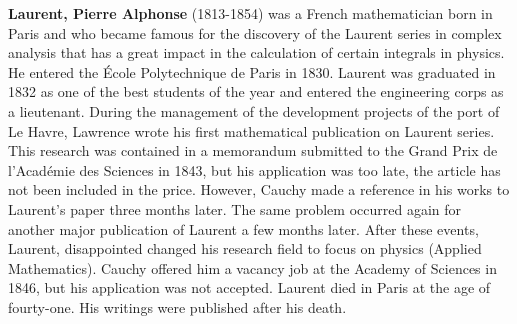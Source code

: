 \textbf{Laurent, Pierre Alphonse} (1813-1854) was a French mathematician born in Paris and who became famous for the discovery of the Laurent series in complex analysis that has a great impact in the calculation of certain integrals in physics. He entered the École Polytechnique de Paris in 1830. Laurent was graduated in 1832 as one of the best students of the year and entered the engineering corps as a lieutenant. During the management of the development projects of the port of Le Havre, Lawrence wrote his first mathematical publication on Laurent series. This research was contained in a memorandum submitted to the Grand Prix de l'Académie des Sciences in 1843, but his application was too late, the article has not been included in the price. However, Cauchy made a reference in his works to Laurent's paper three months later. The same problem occurred again for another major publication of Laurent a few months later. After these events, Laurent, disappointed changed his research field to focus on physics (Applied Mathematics). Cauchy offered him a vacancy job at the Academy of Sciences in 1846, but his application was not accepted. Laurent died in Paris at the age of fourty-one. His writings were published after his death.

